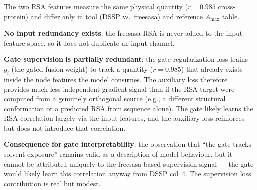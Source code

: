 \documentclass[10pt, a4paper]{article}
\begin{document}
\begin{tcolorbox}[colback=lightbg, colframe=primaryblue,
    title=\textbf{Redundancy Assessment and Implication for Gate Interpretability}]
The two RSA features measure the same physical quantity ($r = 0.985$ cross-protein)
and differ only in tool (DSSP vs.\ freesasa) and reference $A_{\max}$ table.

\medskip
\textbf{No input redundancy exists}: the freesasa RSA is never added to the input
feature space, so it does not duplicate an input channel.

\medskip
\textbf{Gate supervision is partially redundant}: the gate regularization loss trains
$g_i$ (the gated fusion weight) to track a quantity ($r = 0.985$) that already exists
inside the node features the model consumes. The auxiliary loss therefore provides
much less independent gradient signal than if the RSA target were computed from a
genuinely orthogonal source (e.g., a different structural conformation or a predicted RSA
from sequence alone). The gate likely learns the RSA correlation largely via the input
features, and the auxiliary loss reinforces but does not introduce that correlation.

\medskip
\textbf{Consequence for gate interpretability}: the observation that ``the gate tracks
solvent exposure'' remains valid as a description of model behaviour, but it cannot be
attributed uniquely to the freesasa-based supervision signal --- the gate would likely
learn this correlation anyway from DSSP col~4. The supervision loss contribution is
real but modest.
\end{tcolorbox}
\end{document}

